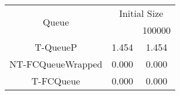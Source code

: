 \begin{tabular}{|c|c|c|}
\hline
\multirow{2}{*}{Queue} & \multicolumn{2}{c|}{Initial Size}\\\cline{2-3}& \qquad 10000 \qquad\quad & 100000\\
\hline
\hline
T-QueueP & 1.454 & 1.454\\
NT-FCQueueWrapped & 0.000 & 0.000\\
T-FCQueue & 0.000 & 0.000\\
\hline\end{tabular}
